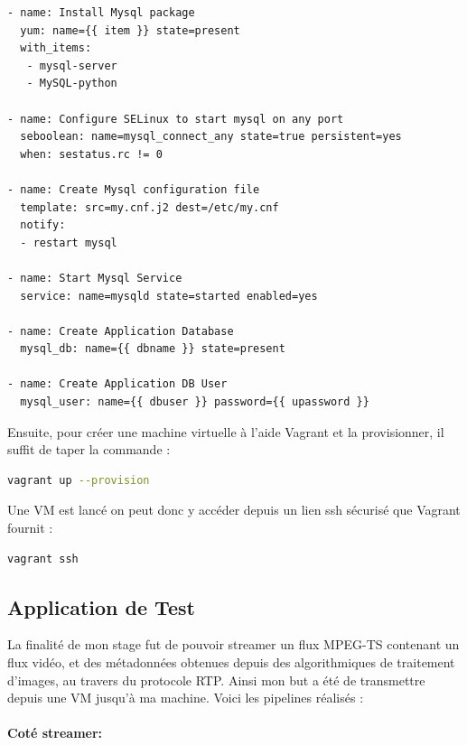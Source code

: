   \begin{lstlisting}[caption=exemple de rôles Ansible ,label=ansible_exemple]
    - name: Install Mysql package
  yum: name={{ item }} state=present
  with_items:
   - mysql-server
   - MySQL-python

- name: Configure SELinux to start mysql on any port
  seboolean: name=mysql_connect_any state=true persistent=yes
  when: sestatus.rc != 0

- name: Create Mysql configuration file
  template: src=my.cnf.j2 dest=/etc/my.cnf
  notify:
  - restart mysql

- name: Start Mysql Service
  service: name=mysqld state=started enabled=yes

- name: Create Application Database
  mysql_db: name={{ dbname }} state=present

- name: Create Application DB User
  mysql_user: name={{ dbuser }} password={{ upassword }}
  \end{lstlisting}


 Ensuite, pour créer une machine virtuelle à l'aide Vagrant et la provisionner, il suffit de taper la commande :
  \begin{lstlisting}[language=bash]
  vagrant up --provision
  \end{lstlisting}
 Une VM est lancé on peut donc y accéder depuis un lien ssh sécurisé que Vagrant fournit :
  \begin{lstlisting}[language=bash]
  vagrant ssh
  \end{lstlisting}


 \subsection{Application de Test}
La finalité de mon stage fut de pouvoir streamer un flux MPEG-TS contenant un flux vidéo, et des métadonnées obtenues depuis des algorithmiques de traitement d'images, au travers du protocole RTP. Ainsi mon but a été de transmettre depuis une VM jusqu'à ma machine.
Voici les pipelines réalisés :

\paragraph{Coté streamer: }


